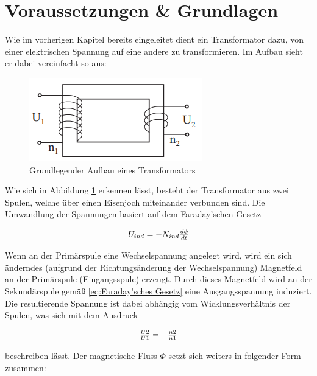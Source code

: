 \documentclass[12pt,a4paper,twoside]{article}
\begin{document}
\section{Voraussetzungen \& Grundlagen} %

Wie im vorherigen Kapitel bereits eingeleitet dient ein Transformator dazu, von einer elektrischen Spannung auf eine andere zu transformieren. Im Aufbau sieht er dabei vereinfacht so aus:

\begin{figure}[H]
    \centering
    \includegraphics[width=0.5\linewidth]{nudes/GL-TrafoAufbau.png}
    \caption{Grundlegender Aufbau eines Transformators \cite{teachcenter1}}
    \label{fig:Aufbau Transformator}
\end{figure}

\noindent
Wie sich in Abbildung \ref{fig:Aufbau Transformator} erkennen lässt, besteht der Transformator aus zwei Spulen, welche über einen Eisenjoch miteinander verbunden sind. Die Umwandlung der Spannungen basiert auf dem Faraday'schen Gesetz

    \begin{equation}
        \label{eq:Faraday'sches Gesetz}
        \centerline{$U_{ind}=-N_{ind}\frac{d \phi}{dt}$}
    \end{equation}

\noindent
Wenn an der Primärspule eine Wechselspannung angelegt wird, wird ein sich änderndes (aufgrund der Richtungsänderung der Wechselspannung) Magnetfeld an der Primärspule (Eingangsspule) erzeugt. Durch dieses Magnetfeld wird an der Sekundärspule gemäß \ref{eq:Faraday'sches Gesetz} eine Ausgangsspannung induziert. 
Die resultierende Spannung ist dabei abhängig vom Wicklungsverhältnis der Spulen, was sich mit dem Ausdruck

\begin{equation}
    \label{eq:Verhältnis Wicklungen/Spannung}
    \centerline{$\frac{U2}{U1}=-\frac{n2}{n1}$}
\end{equation}

\noindent
beschreiben lässt. Der magnetische Fluss $\Phi$ setzt sich weiters in folgender Form zusammen:
\end{document}
